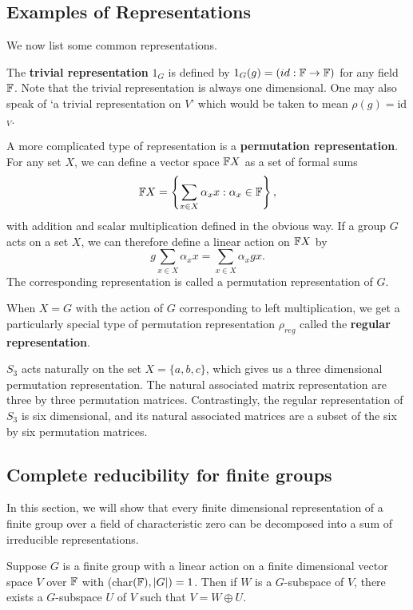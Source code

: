 \documentclass[a4paper]{article}
\begin{document}
\subsection{Examples of Representations}
We now list some common representations. 

The \textbf{trivial representation} $1_G$ is defined by $1_G(g) = (id : \mathbb{F} \to \mathbb{F})$ for any field $\mathbb{F}$. Note that the trivial representation is always one dimensional. One may also speak of `a trivial representation on $V$' which would be taken to mean $\rho(g) = $id$_V$.

A more complicated type of representation is a \textbf{permutation representation}. For any set $X$, we can define a vector space $\mathbb{F} X$ as a set of formal sums $$\mathbb{F} X = \left\{ \sum_{x \in X} \alpha_x x : \alpha_x \in \mathbb{F} \right\},$$ with addition and scalar multiplication defined in the obvious way. 
If a group $G$ acts on a set $X$, we can therefore define a linear action on $\mathbb{F} X$ by $$g\sum_{x \in X} \alpha_x x = \sum_{x \in X} \alpha_x gx.$$ The corresponding representation is called a permutation representation of $G$.

When $X = G$ with the action of $G$ corresponding to left multiplication, we get a particularly special type of permutation representation $\rho_{reg}$ called the \textbf{regular representation}. 

\begin{eg}[Representations of $S_3$] 
    $S_3$ acts naturally on the set $X = \{a,b,c\}$, which gives us a three dimensional permutation representation. The natural associated matrix representation are three by three permutation matrices. Contrastingly, the regular representation of $S_3$ is six dimensional, and its natural associated matrices are a subset of the six by six permutation matrices.
\end{eg}

\subsection{Complete reducibility for finite groups}

In this section, we will show that every finite dimensional representation of a finite group over a field of characteristic zero can be decomposed into a sum of irreducible representations.

\begin{thm}
    Suppose $G$ is a finite group with a linear action on a finite dimensional vector space $V$ over $\mathbb{F}$ with (char$(\mathbb{F}), |G|) = 1$. Then if $W$ is a $G$-subspace of $V$, there exists a $G$-subspace $U$ of $V$ such that $V = W \oplus U$.
\end{thm}
\end{document}
